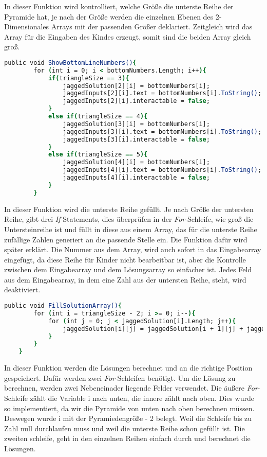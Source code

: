 In dieser Funktion wird kontrolliert, welche Größe die unterste Reihe der Pyramide hat, je nach der Größe werden die einzelnen Ebenen des 2-Dimensionales Arrays mit der passenden Größer deklariert. Zeitgleich wird das Array für die Eingaben des Kindes erzeugt, somit sind die beiden Array gleich groß.\\
\begin{lstlisting}[language=csh, caption={Triangle.cs ShowBottomLineNumbers-Funktion}]
	public void ShowBottomLineNumbers(){
		for (int i = 0; i < bottomNumbers.Length; i++){
			if(triangleSize == 3){
				jaggedSolution[2][i] = bottomNumbers[i];
				jaggedInputs[2][i].text = bottomNumbers[i].ToString();
				jaggedInputs[2][i].interactable = false;
			}
			else if(triangleSize == 4){
				jaggedSolution[3][i] = bottomNumbers[i];
				jaggedInputs[3][i].text = bottomNumbers[i].ToString();
				jaggedInputs[3][i].interactable = false;
			}
			else if(triangleSize == 5){
				jaggedSolution[4][i] = bottomNumbers[i];
				jaggedInputs[4][i].text = bottomNumbers[i].ToString();
				jaggedInputs[4][i].interactable = false;
			}
		}
\end{lstlisting}
In dieser Funktion wird die unterste Reihe gefüllt. Je nach Größe der untersten Reihe, gibt drei \textit{If}-Statements, dies überprüfen in der \textit{For}-Schleife, wie groß die Untersteinreihe ist und füllt in diese aus einem Array, das für die unterste Reihe zufällige Zahlen generiert an die passende Stelle ein. Die Funktion dafür wird später erklärt. Die Nummer aus dem Array, wird auch sofort in das Eingabearray eingefügt, da diese Reihe für Kinder nicht bearbeitbar ist, aber die Kontrolle zwischen dem Eingabearray und dem Lösungsarray so einfacher ist. Jedes Feld aus dem Eingabearray, in dem eine Zahl aus der untersten Reihe, steht, wird deaktiviert.\\
\begin{lstlisting}[language=csh, caption={Triangle.cs FillSolutionArray-Funktion}]
	public void FillSolutionArray(){
		for (int i = triangleSize - 2; i >= 0; i--){
			for (int j = 0; j < jaggedSolution[i].Length; j++){
				jaggedSolution[i][j] = jaggedSolution[i + 1][j] + jaggedSolution[i + 1][j + 1];
			}
		}
	}
\end{lstlisting}
In dieser Funktion werden die Lösungen berechnet und an die richtige Position gespeichert. Dafür werden zwei \textit{For}-Schleifen benötigt. Um die Lösung zu berechnen, werden zwei Nebeneinader liegende Felder verwendet. Die äußere \textit{For}-Schleife zählt die Variable i nach unten, die innere zählt nach oben. Dies wurde so implementiert, da wir die Pyramide von unten nach oben berechnen müssen. Deswegen wurde i mit der Pyramiedengröße - 2 belegt. Weil die Schleife bis zu Zahl null durchlaufen muss und weil die unterste Reihe schon gefüllt ist. Die zweiten schleife, geht in den einzelnen Reihen einfach durch und berechnet die Lösungen.\\

